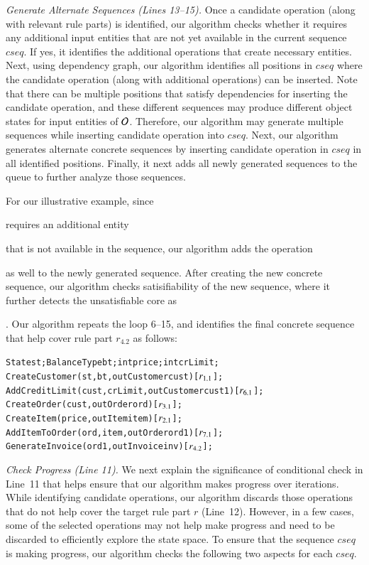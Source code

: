 \textit{Generate Alternate Sequences (Lines 13--15).} Once a candidate operation 
(along with relevant rule parts) is identified, our algorithm
checks whether it requires any additional input entities that
are not yet available in the current sequence $cseq$.
If yes, it identifies the additional operations that create necessary
entities. Next, using dependency graph, our algorithm identifies all positions in $cseq$
where the candidate operation (along with additional operations) 
can be inserted. Note that there can be multiple positions that satisfy
dependencies for inserting the candidate operation, and these different
sequences may produce different object states for input entities of ${\cal O}$.
Therefore, our algorithm may generate multiple sequences while
inserting candidate operation into $cseq$. 
Next, our algorithm generates alternate concrete sequences by inserting
candidate operation in $cseq$ in all identified positions. 
Finally, it next adds all newly generated sequences to the queue to further
analyze those sequences.

For our illustrative example, since \subject{AddItemToOrder} requires an 
additional entity \subject{Item} that is not available
in the sequence, our algorithm adds the operation \subject{CreateItem} as well
to the newly generated sequence. After creating
the new concrete sequence, our algorithm checks satisifiability of the new sequence,
where it further detects the unsatisfiable core as \subject{cust.crLimit = 0 $\wedge$ cust.crLimit > 0}. 
Our algorithm repeats the loop 6--15, and identifies the final concrete sequence that help cover rule part $r_{4.2}$ as
follows:

\vspace*{-5pt}
{\small
\begin{alltt}
  State st; BalanceType bt; int price; int crLimit;
  CreateCustomer(st, bt, out Customer cust) [\(r\sb{1.1}\)];
  AddCreditLimit(cust, crLimit, out Customer cust1) [\(r\sb{6.1}\)];
  CreateOrder(cust, out Order ord) [\(r\sb{3.1}\)];
  CreateItem(price, out Item item) [\(r\sb{2.1}\)];
  AddItemToOrder(ord, item, out Order ord1) [\(r\sb{7.1}\)];
  GenerateInvoice(ord1, out Invoice inv) [\(r\sb{4.2}\)];  
\end{alltt}
}
\vspace*{-5pt}

\textit{Check Progress (Line 11).} We next explain the significance of conditional
check in Line~11 that helps ensure that our algorithm makes progress over iterations.
While identifying candidate operations, our algorithm discards those operations that
do not help cover the target rule part $r$ (Line~12). However, in a few cases, some of the
selected operations may not help make progress and need to be discarded to efficiently
explore the state space. To ensure that the sequence $cseq$ is making progress,
our algorithm checks the following two aspects for each $cseq$.

